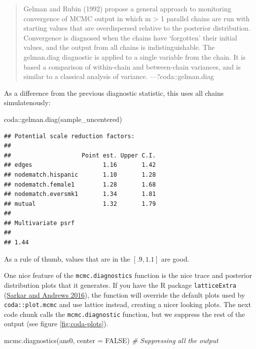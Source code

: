 \documentclass[
]{book}
\newenvironment{Shaded}{\begin{snugshade}}{\end{snugshade}}
\newcommand{\AttributeTok}[1]{\textcolor[rgb]{0.77,0.63,0.00}{#1}}
\newcommand{\CommentTok}[1]{\textcolor[rgb]{0.56,0.35,0.01}{\textit{#1}}}
\newcommand{\ConstantTok}[1]{\textcolor[rgb]{0.00,0.00,0.00}{#1}}
\newcommand{\FunctionTok}[1]{\textcolor[rgb]{0.00,0.00,0.00}{#1}}
\newcommand{\NormalTok}[1]{#1}
\newcommand{\SpecialCharTok}[1]{\textcolor[rgb]{0.00,0.00,0.00}{#1}}
\begin{document}
\begin{enumerate}
  \begin{quote}
  Gelman and Rubin (1992) propose a general approach to monitoring convergence of MCMC output in which m \textgreater{} 1 parallel chains are run with starting values that are overdispersed relative to the posterior distribution. Convergence is diagnosed when the chains have `forgotten' their initial values, and the output from all chains is indistinguishable. The gelman.diag diagnostic is applied to a single variable from the chain. It is based a comparison of within-chain and between-chain variances, and is similar to a classical analysis of variance.
  ---?coda::gelman.diag
  \end{quote}

  As a difference from the previous diagnostic statistic, this uses all chains simulatenously:

\begin{Shaded}
\begin{Highlighting}[]
\NormalTok{coda}\SpecialCharTok{::}\FunctionTok{gelman.diag}\NormalTok{(sample\_uncentered)}
\end{Highlighting}
\end{Shaded}

\begin{verbatim}
## Potential scale reduction factors:
## 
##                    Point est. Upper C.I.
## edges                    1.16       1.42
## nodematch.hispanic       1.10       1.28
## nodematch.female1        1.28       1.68
## nodematch.eversmk1       1.34       1.81
## mutual                   1.32       1.79
## 
## Multivariate psrf
## 
## 1.44
\end{verbatim}

  As a rule of thumb, values that are in the \([.9,1.1]\) are good.
\end{enumerate}

One nice feature of the \texttt{mcmc.diagnostics} function is the nice trace and posterior distribution plots that it generates. If you have the R package \texttt{latticeExtra} (\protect\hyperlink{ref-R-latticeExtra}{Sarkar and Andrews 2016}), the function will override the default plots used by \texttt{coda::plot.mcmc} and use lattice instead, creating a nicer looking plots. The next code chunk calls the \texttt{mcmc.diagnostic} function, but we suppress the rest of the output (see figure \ref{fig:coda-plots}).

\begin{Shaded}
\begin{Highlighting}[]
\FunctionTok{mcmc.diagnostics}\NormalTok{(ans0, }\AttributeTok{center =} \ConstantTok{FALSE}\NormalTok{) }\CommentTok{\# Suppressing all the output}
\end{Highlighting}
\end{Shaded}
\end{document}
